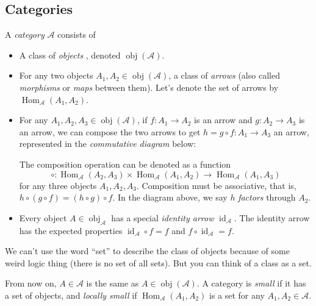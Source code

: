 \subsection{Categories}
\begin{definition}[Category]
    A \emph{category} $\mathcal{A}$ consists of 
    \begin{itemize}
        \item A class of \emph{objects} , denoted $\operatorname{obj}(\mathcal{A}).$ 
        \item For any two objects $A_1,A_2\in \operatorname{obj}(\mathcal{A})$, a class of \emph{arrows} (also called  \emph{morphisms} or \emph{maps} between them). Let's denote the set of arrows by $\operatorname{Hom}_{\mathcal{A}}(A_1,A_2)$.
        \item For any $A_1,A_2,A_3\in \operatorname{obj}(\mathcal{A})$, if $f \colon A_1 \to A_2$ is an arrow and $g \colon A_2 \to A_3$ is an arrow, we can compose the two arrows to get $h=g\circ f \colon A_1 \to A_3$ an arrow, represented in the \emph{commutative diagram} below: 
            \begin{figure}[H]
                \centering
            \end{figure}
        The composition operation can be denoted as a function \[
            \circ \colon \operatorname{Hom}_{\mathcal{A}}(A_2,A_3)\times \operatorname{Hom}_{\mathcal{A}}(A_1,A_2) \to \operatorname{Hom}_{\mathcal{A}}(A_1,A_3)
        \] for any three objects $A_1,A_2,A_3$. Composition must be associative, that is, $h\circ(g\circ f)=(h\circ g)\circ f.$ In the diagram above, we say $h$ \emph{factors} through $A_2$.
    \item Every object $A\in \operatorname{obj}_{\mathcal{A}}$ has a special \emph{identity arrow} $ \operatorname{id}_{\mathcal{A}}$. The identity arrow has the expected properties $\operatorname{id}_{\mathcal{A}}\circ f=f$ and $f\circ \operatorname{id}_{\mathcal{A}}=f$.
    \end{itemize}
\end{definition}
\begin{note}
    We can't use the word ``set'' to describe the class of objects because of some weird logic thing (there is no set of all sets). But you can think of a class as a set.
\end{note}
From now on, $A\in \mathcal{A}$ is the same as $A\in \operatorname{obj}(\mathcal{A})$. A category is \emph{small} if it has a set of objects, and \emph{locally small} if $\operatorname{Hom}_{\mathcal{A}}(A_1,A_2)$ is a set for any $A_1,A_2\in \mathcal{A}$.

